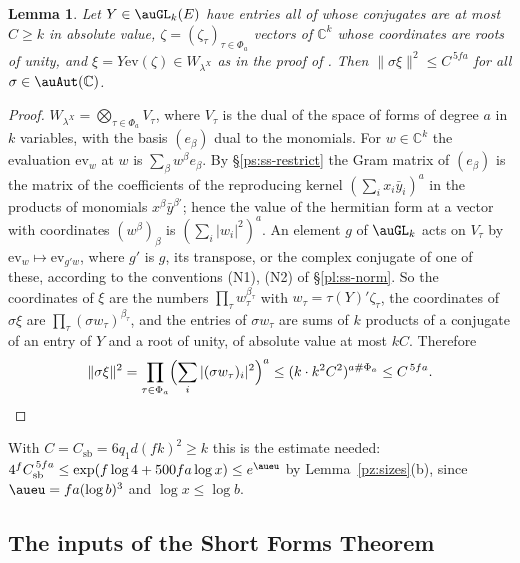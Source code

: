 \documentclass[10pt]{amsart}
\newtheorem{lemma}[theorem]{Lemma}
\theoremstyle{definition}
\theoremstyle{remark}
\newcommand{\C}{\mathbb C}
\providecommand{\auPa}{\Phi_a}
\begin{document}
\begin{lemma}\label{pz:short}
Let $Y\in\auGL_k(E)$ have entries all of whose conjugates are at most $C\ge k$ in absolute value,
$\zeta=(\zeta_\tau)_{\tau\in\auPa}$ vectors of $\C^k$ whose coordinates are roots of unity, and
$\xi=Y\mathrm{ev}(\zeta)\in W_{\lambda^X}$ as in the proof of {\cite[Proposition~14.22]{P46}}. Then
$\|\sigma\xi\|^2\le C^{\,5fa}$ for all $\sigma\in\auAut(\C)$.
\end{lemma}
\begin{proof}
$W_{\lambda^X}=\bigotimes_{\tau\in\auPa}V_\tau$, where $V_\tau$ is the dual of the space of forms of
degree $a$ in $k$ variables, with the basis $(e_\beta)$ dual to the monomials. For $w\in\C^k$ the
evaluation $\mathrm{ev}_w$ at $w$ is $\sum_\beta w^\beta e_\beta$. By \S\ref{ps:ss-restrict} the
Gram matrix of $(e_\beta)$ is the matrix of the coefficients of the reproducing kernel
$(\sum_ix_i\bar y_i)^a$ in the products of monomials $x^\beta\bar y^{\beta'}$; hence the value of the
hermitian form at a vector with coordinates $(w^\beta)_\beta$ is $(\sum_i|w_i|^2)^a$. An element
$g$ of $\auGL_k$ acts on $V_\tau$ by $\mathrm{ev}_w\mapsto\mathrm{ev}_{g'w}$, where $g'$ is $g$, its
transpose, or the complex conjugate of one of these, according to the conventions (N1), (N2) of
\S\ref{pl:ss-norm}. So the coordinates of $\xi$ are the numbers $\prod_\tau w_\tau^{\beta_\tau}$ with
$w_\tau=\tau(Y)'\zeta_\tau$, the coordinates of $\sigma\xi$ are $\prod_\tau(\sigma w_\tau)^{\beta_\tau}$,
and the entries of $\sigma w_\tau$ are sums of $k$ products of a conjugate of an entry of $Y$ and a
root of unity, of absolute value at most $kC$. Therefore
\[
\|\sigma\xi\|^2=\prod_{\tau\in\auPa}\Bigl(\sum_i|(\sigma w_\tau)_i|^2\Bigr)^a\le(k\cdot k^2C^2)^{a\#\auPa}
\le C^{\,5fa}.\qedhere
\]
\end{proof}
With $C=C_{\mathrm{sb}}=6q_1d(fk)^2\ge k$ this is the estimate needed: $4^fC_{\mathrm{sb}
}^{\,5fa}\le\exp(f\log4+500fa\log x)\le e^{\aueu}$ by Lemma~\ref{pz:sizes}(b), since
$\aueu=fa(\log b)^3$ and $\log x\le\log b$.

\subsection{The inputs of the Short Forms Theorem}\label{pz:ss-audit}
\end{document}
